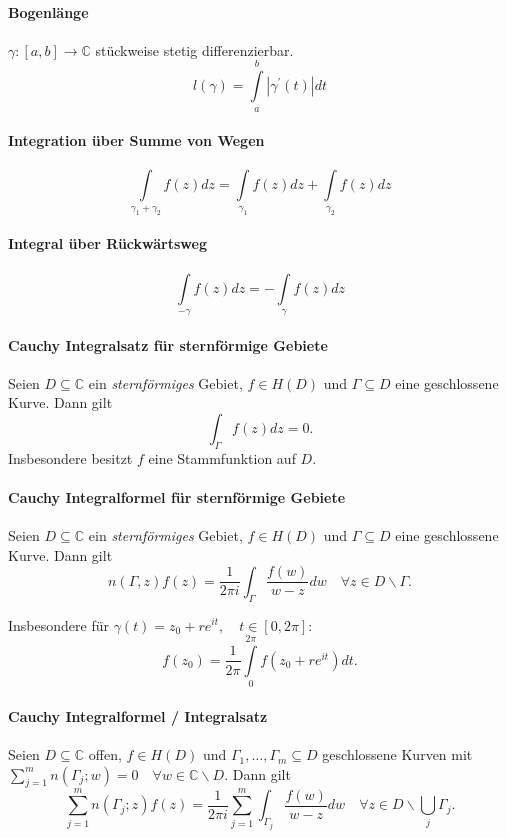 \documentclass[a4paper, 10pt, DIV20, headings=small]{scrartcl}
\theoremstyle{definition}
\theoremstyle{plain}
\begin{document}
\paragraph{Bogenlänge}
$\gamma \colon [a,b] \rightarrow \mathbb{C}$ stückweise stetig differenzierbar.
$$l(\gamma) = \int\limits_a^b{|\gamma^\prime (t)| dt}$$

\paragraph{Integration über Summe von Wegen}
$$\int\limits_{\gamma_1 + \gamma_2}f(z) dz = \int\limits_{\gamma_1}f(z) dz + \int\limits_{\gamma_2}f(z) dz$$

\paragraph{Integral über Rückwärtsweg}
$$\int\limits_{-\gamma}f(z)dz = - \int \limits_{\gamma} f(z) dz$$

\paragraph{Cauchy Integralsatz für sternförmige Gebiete}
Seien $D \subseteq \mathbb{C}$ ein \emph{sternförmiges} Gebiet, $f \in H(D)$ und $\Gamma \subseteq D$ eine geschlossene Kurve. Dann gilt
$$\int_\Gamma f(z) dz = 0.$$ Insbesondere besitzt $f$ eine Stammfunktion auf $D$.

\paragraph{Cauchy Integralformel für sternförmige Gebiete}
Seien $D \subseteq \mathbb{C}$ ein \emph{sternförmiges} Gebiet, $f \in H(D)$ und $\Gamma \subseteq D$ eine geschlossene Kurve. Dann gilt
$$n(\Gamma,z)f(z) = \frac{1}{2 \pi i} \int_\Gamma \frac{f(w)}{w-z} dw \quad \forall z \in D \backslash \Gamma.$$

Insbesondere für $\gamma(t) = z_0 + r e^{it},\quad t \in [0,2\pi]$:
$$f(z_0) = \frac{1}{2 \pi} \int\limits_{0}^{2 \pi}f(z_0 + r e^{it}) dt.$$

\paragraph{Cauchy Integralformel / Integralsatz}
Seien $D \subseteq \mathbb{C}$ offen, $f \in H(D)$ und $\Gamma_1, \ldots, \Gamma_m \subseteq D$ geschlossene Kurven mit $\sum\limits_{j=1}^m{n(\Gamma_j;w)} = 0\quad \forall w \in \mathbb{C} \backslash D$. Dann gilt
$$\sum\limits_{j=1}^m {n(\Gamma_j;z)}f(z) = \frac{1}{2 \pi i} \sum\limits_{j=1}^m{ \int_{\Gamma_j} \frac{f(w)}{w-z} dw} \quad \forall z \in D \backslash \bigcup_j {\Gamma_j}.$$
\end{document}
